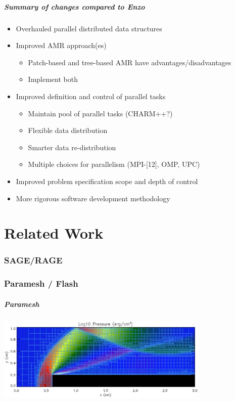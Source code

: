 \documentclass{beamer}
\newcommand{\enzo}{\textsf{Enzo}}
\begin{document}
\begin{frame}
\frametitle{Summary of changes compared to \enzo}
\begin{itemize}
\item Overhauled parallel distributed data structures
\item Improved AMR approach(es)
\begin{itemize}
\item  Patch-based and tree-based AMR have advantages/disadvantages
\item  Implement both
\end{itemize}
\item Improved definition and control of parallel tasks
\begin{itemize}
\item Maintain pool of parallel tasks (CHARM++?)
\item Flexible data distribution
\item Smarter  data re-distribution
\item Multiple choices for parallelism (MPI-[12], OMP, UPC)
\end{itemize}
\item Improved problem specification scope and depth of control
\item More rigorous software development methodology
\end{itemize}

\end{frame}

\part{Related Work}

\section{SAGE/RAGE}

\section{Paramesh / Flash}

\begin{frame}
\frametitle{Paramesh}
\centerline{\includegraphics[width=4in]{paramesh.eps}}
\end{frame}
\end{document}
